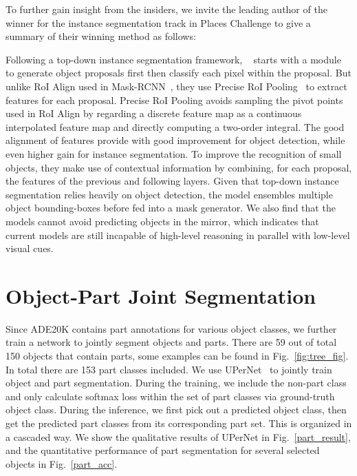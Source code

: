 To further gain insight from the insiders, we invite the leading author of the winner for the instance segmentation track in Places Challenge to give a summary of their winning method as follows: 

Following a top-down instance segmentation framework, ~\cite{peng2018megdet} starts with a module to generate object proposals first then classify each pixel within the proposal. But unlike RoI Align used in Mask-RCNN~\cite{he2017mask}, they use Precise RoI Pooling~\cite{jiang2018acquisition} to extract features for each proposal. Precise RoI Pooling avoids sampling the pivot points used in RoI Align by regarding a discrete feature map as a continuous interpolated feature map and directly computing a two-order integral. The good alignment of features provide with good improvement for object detection, while even higher gain for instance segmentation. To improve the recognition of small objects, they make use of contextual information by combining, for each proposal, the features of the previous and following layers. Given that top-down instance segmentation relies heavily on object detection, the model ensembles multiple object bounding-boxes before fed into a mask generator. We also find that the models cannot avoid predicting objects in the mirror, which indicates that current models are still incapable of high-level reasoning in parallel with low-level visual cues.

\section{Object-Part Joint Segmentation}
\label{section:jointtraining}

Since ADE20K contains part annotations for various object classes, we further train a network to jointly segment objects and parts. There are 59 out of total 150 objects that contain parts, some examples can be found in Fig.~\ref{fig:tree_fig}. In total there are 153 part classes included. We use UPerNet~\cite{xiao2018unified} to jointly train object and part segmentation. During the training, we include the non-part class and only calculate softmax loss within the set of part classes via ground-truth object class. During the inference, we first pick out a predicted object class, then get the predicted part classes from its corresponding part set. This is organized in a cascaded way. We show the qualitative results of UPerNet in Fig.~\ref{part_result}, and the quantitative performance of part segmentation for several selected objects in Fig.~\ref{part_acc}.

